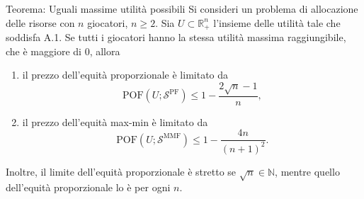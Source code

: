\documentclass{beamer}
\begin{document}
\begin{frame}
	 \begin{exampleblock}{Teorema: Uguali massime utilità possibili}
	 	Si consideri un problema di allocazione delle risorse con $n$ giocatori, $n \ge 2$. Sia $U \subset \mathbb{R}^n_+$ l'insieme delle utilità tale che soddisfa A.1. Se tutti i giocatori hanno la stessa utilità massima raggiungibile, che è maggiore di $0$, allora
	 	\begin{enumerate}
	 		\item il prezzo dell'equità proporzionale è limitato da
	 		\vspace{-0.3cm}
	 		\begin{equation}
	 			\text{POF}(U;\mathcal{S}^{\text{PF}}) \le 1 - \frac{2 \sqrt{n} - 1}{n},
	 		\end{equation}
	 		\item il prezzo dell'equità max-min è limitato da
	 		\vspace{-0.3cm}
	 		\begin{equation}
	 			\text{POF}(U;\mathcal{S}^{\text{MMF}}) \le 1 - \frac{4n}{(n+1)^2}.
	 		\end{equation}
	 	\end{enumerate}
 		Inoltre, il limite dell'equità proporzionale è stretto se $\sqrt{n} \in \mathbb{N}$, mentre quello dell'equità proporzionale lo è per ogni $n$.
	 \end{exampleblock}
\end{frame}
\end{document}
